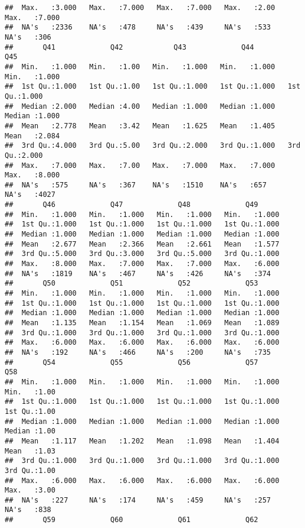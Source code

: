 \documentclass[
]{article}
\begin{document}
\begin{verbatim}
##  Max.   :3.000   Max.   :7.000   Max.   :7.000   Max.   :2.00   Max.   :7.000  
##  NA's   :2336    NA's   :478     NA's   :439     NA's   :533    NA's   :306    
##       Q41             Q42            Q43             Q44             Q45       
##  Min.   :1.000   Min.   :1.00   Min.   :1.000   Min.   :1.000   Min.   :1.000  
##  1st Qu.:1.000   1st Qu.:1.00   1st Qu.:1.000   1st Qu.:1.000   1st Qu.:1.000  
##  Median :2.000   Median :4.00   Median :1.000   Median :1.000   Median :1.000  
##  Mean   :2.778   Mean   :3.42   Mean   :1.625   Mean   :1.405   Mean   :2.084  
##  3rd Qu.:4.000   3rd Qu.:5.00   3rd Qu.:2.000   3rd Qu.:1.000   3rd Qu.:2.000  
##  Max.   :7.000   Max.   :7.00   Max.   :7.000   Max.   :7.000   Max.   :8.000  
##  NA's   :575     NA's   :367    NA's   :1510    NA's   :657     NA's   :4027   
##       Q46             Q47             Q48             Q49       
##  Min.   :1.000   Min.   :1.000   Min.   :1.000   Min.   :1.000  
##  1st Qu.:1.000   1st Qu.:1.000   1st Qu.:1.000   1st Qu.:1.000  
##  Median :1.000   Median :1.000   Median :1.000   Median :1.000  
##  Mean   :2.677   Mean   :2.366   Mean   :2.661   Mean   :1.577  
##  3rd Qu.:5.000   3rd Qu.:3.000   3rd Qu.:5.000   3rd Qu.:1.000  
##  Max.   :8.000   Max.   :7.000   Max.   :7.000   Max.   :6.000  
##  NA's   :1819    NA's   :467     NA's   :426     NA's   :374    
##       Q50             Q51             Q52             Q53       
##  Min.   :1.000   Min.   :1.000   Min.   :1.000   Min.   :1.000  
##  1st Qu.:1.000   1st Qu.:1.000   1st Qu.:1.000   1st Qu.:1.000  
##  Median :1.000   Median :1.000   Median :1.000   Median :1.000  
##  Mean   :1.135   Mean   :1.154   Mean   :1.069   Mean   :1.089  
##  3rd Qu.:1.000   3rd Qu.:1.000   3rd Qu.:1.000   3rd Qu.:1.000  
##  Max.   :6.000   Max.   :6.000   Max.   :6.000   Max.   :6.000  
##  NA's   :192     NA's   :466     NA's   :200     NA's   :735    
##       Q54             Q55             Q56             Q57             Q58      
##  Min.   :1.000   Min.   :1.000   Min.   :1.000   Min.   :1.000   Min.   :1.00  
##  1st Qu.:1.000   1st Qu.:1.000   1st Qu.:1.000   1st Qu.:1.000   1st Qu.:1.00  
##  Median :1.000   Median :1.000   Median :1.000   Median :1.000   Median :1.00  
##  Mean   :1.117   Mean   :1.202   Mean   :1.098   Mean   :1.404   Mean   :1.03  
##  3rd Qu.:1.000   3rd Qu.:1.000   3rd Qu.:1.000   3rd Qu.:1.000   3rd Qu.:1.00  
##  Max.   :6.000   Max.   :6.000   Max.   :6.000   Max.   :6.000   Max.   :3.00  
##  NA's   :227     NA's   :174     NA's   :459     NA's   :257     NA's   :838   
##       Q59             Q60             Q61             Q62       

\end{verbatim}
\end{document}
